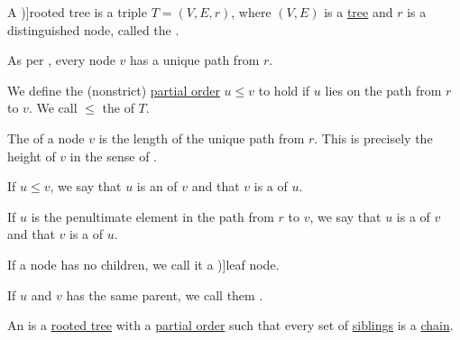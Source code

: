 \begin{definition}\label{def:rooted_tree}
  A \term[ru=корневое дерево (\cite[37]{Карпов2017})]{rooted tree} is a triple \( T = (V, E, r) \), where \( (V, E) \) is a \hyperref[def:tree]{tree} and \( r \) is a distinguished node, called the .

  As per , every node \( v \) has a unique path from \( r \).

  \begin{thmenum}
     We define the (nonstrict) \hyperref[def:partially_ordered_set]{partial order} \( u \leq v \) to hold if \( u \) lies on the path from \( r \) to \( v \). We call \( \leq \) the  of \( T \).

     The  of a node \( v \) is the length of the unique path from \( r \). This is precisely the height of \( v \) in the sense of .

     If \( u \leq v \), we say that \( u \) is an  of \( v \) and that \( v \) is a  of \( u \).

     If \( u \) is the penultimate element in the path from \( r \) to \( v \), we say that \( u \) is a  of \( v \) and that \( v \) is a  of \( u \).

     If a node has no children, we call it a \term[ru=лист (\cite[25]{Карпов2017})]{leaf node}.

     If \( u \) and \( v \) has the same parent, we call them .
  \end{thmenum}
\end{definition}

\begin{definition}\label{def:ordered_tree}
  An  is a \hyperref[def:rooted_tree]{rooted tree} with a \hyperref[def:partially_ordered_set]{partial order} such that every set of \hyperref[def:rooted_tree/siblings]{siblings} is a \hyperref[def:partial_order_chain]{chain}.
\end{definition}


